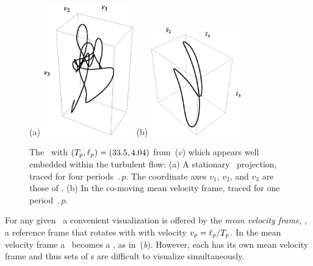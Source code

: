 \begin{figure}[t]
\begin{center}
(a) \includegraphics[width=0.35\textwidth]{figs/ks22rpo033.50_04.045E2.eps}
(b) \includegraphics[width=0.35\textwidth]{figs/ks22rpo033.50_04.045E2CM.eps}
\\
\end{center}
\caption{
 The
\rpo\ with $({T_{p}},\ell_p) =(33.5,4.04)$
from \,(\textit{c})
which appears well embedded within the turbulent flow:
 (a) A stationary \statesp\ projection,
  traced for four periods $\period{p}$. The coordinate axes
$v_1$, $v_2$, and $v_3$ are those of .
 (b) In the co-moving mean velocity frame,
 traced for one period $\period{p}$.
        } \label{f:MeanVelocityFrame}
\end{figure}

For any given \rpo\ a convenient visualization is
offered by the
{\em mean velocity frame}, {\ie},
a reference frame that rotates with with velocity
$v_p=\ell_p/{T_{p}}$.
In the mean velocity frame a \rpo\ becomes
a \po, as in \,(\textit{b}).
However, each {\rpo} has its own mean velocity frame and thus
sets of \rpo s are difficult to visualize simultaneously.


